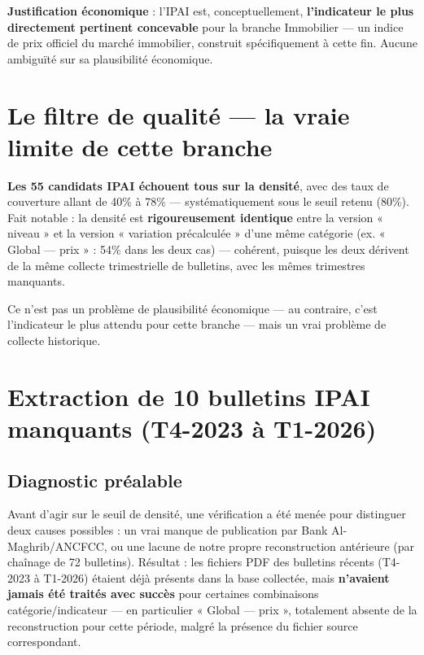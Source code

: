 \documentclass[11pt,a4paper]{article}
\begin{document}
\textbf{Justification économique} : l'IPAI est, conceptuellement, \textbf{l'indicateur le plus directement pertinent concevable} pour la branche Immobilier --- un indice de prix officiel du marché immobilier, construit spécifiquement à cette fin. Aucune ambiguïté sur sa plausibilité économique.

\section{Le filtre de qualité --- la vraie limite de cette branche}

\begin{noteboxbleu}
\textbf{Les 55 candidats IPAI échouent tous sur la densité}, avec des taux de couverture allant de 40\% à 78\% --- systématiquement sous le seuil retenu (80\%). Fait notable : la densité est \textbf{rigoureusement identique} entre la version « niveau » et la version « variation précalculée » d'une même catégorie (ex. « Global — prix » : 54\% dans les deux cas) --- cohérent, puisque les deux dérivent de la même collecte trimestrielle de bulletins, avec les mêmes trimestres manquants.

Ce n'est pas un problème de plausibilité économique --- au contraire, c'est l'indicateur le plus attendu pour cette branche --- mais un vrai problème de collecte historique.
\end{noteboxbleu}

\section{Extraction de 10 bulletins IPAI manquants (T4-2023 à T1-2026)}

\subsection{Diagnostic préalable}

Avant d'agir sur le seuil de densité, une vérification a été menée pour distinguer deux causes possibles : un vrai manque de publication par Bank Al-Maghrib/ANCFCC, ou une lacune de notre propre reconstruction antérieure (par chaînage de 72 bulletins). Résultat : les fichiers PDF des bulletins récents (T4-2023 à T1-2026) étaient déjà présents dans la base collectée, mais \textbf{n'avaient jamais été traités avec succès} pour certaines combinaisons catégorie/indicateur --- en particulier « Global — prix », totalement absente de la reconstruction pour cette période, malgré la présence du fichier source correspondant.
\end{document}
